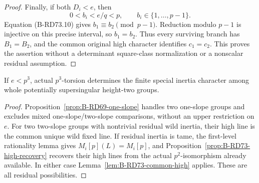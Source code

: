 \begin{proof}
Finally, if both \(D_i<e\), then
\[
 0<b_i<e/q<p,
 \qquad b_i\in\{1,\ldots,p-1\}.
 \tag{B-RD73.14}
\]
Equation (B-RD73.10) gives \(b_1\equiv b_2\pmod{p-1}\).
Reduction modulo \(p-1\) is injective on this precise interval,
so \(b_1=b_2\). Thus every surviving branch has \(B_1=B_2\),
and the common original high character identifies \(c_1=c_2\).
This proves the assertion without a determinant square-class
normalization or a nonscalar residual assumption.
\end{proof}

\begin{proposition}
\label{prop:B-RD73-formal}
If \(e<p^3\), actual \(p^3\)-torsion determines the finite
special inertia character among whole potentially supersingular
height-two groups.
\end{proposition}
\begin{proof}
Proposition~\ref{prop:B-RD69-one-slope} handles two one-slope
groups and excludes mixed one-slope/two-slope comparisons,
without an upper restriction on \(e\).
For two two-slope groups with nontrivial residual wild inertia,
their high line is the common unique wild fixed line.
If residual inertia is tame, the first-level rationality lemma
gives \(M_i[p](L)=M_i[p]\), and
Proposition~\ref{prop:B-RD73-high-recovery} recovers their high
lines from the actual \(p^2\)-isomorphism already available.
In either case Lemma~\ref{lem:B-RD73-common-high} applies.
These are all residual possibilities.
\end{proof}

